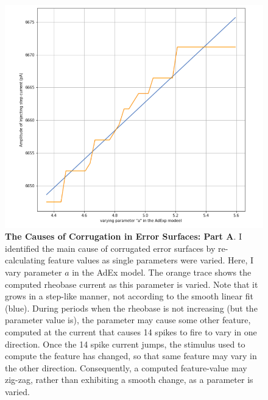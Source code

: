 \begin{figure}
\begin{center}
\includegraphics[]{figures/fundamental_cause_of_corrogations.png}
\caption[Causes of Corrugation (1)]{\textbf{The Causes of Corrugation in Error Surfaces: Part A}.
I identified the main cause of corrugated error surfaces by re-calculating feature values as single parameters were varied.
Here, I vary parameter $a$ in the AdEx model.
The orange trace shows the computed rheobase current as this parameter is varied.
Note that it grows in a step-like manner, not according to the smooth linear fit (blue).
During periods when the rheobase is not increasing (but the parameter value is), the parameter may cause some other feature, computed at the current that causes 14 spikes to fire to vary in one direction.
Once the 14 spike current jumps, the stimulus used to compute the feature has changed, so that same feature may vary in the other direction.
Consequently, a computed feature-value may zig-zag, rather than exhibiting a smooth change, as a parameter is varied.}
\label{fig:corrugation-cause-1}
\end{center}
\end{figure}

